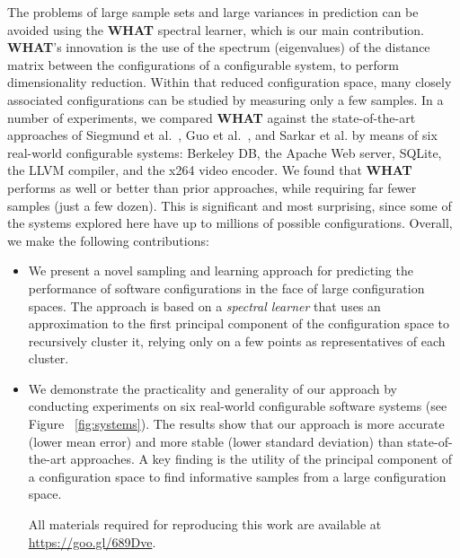 \documentclass[smallextended]{svjour3}       %
\newcommand{\what}{{\bf WHAT}\xspace}
\begin{document}
The problems of large sample sets and large variances in prediction can be avoided using the \what spectral learner, which is our main contribution.  
{\what}'s innovation is  the use of the spectrum (eigenvalues) of the distance matrix
between the configurations of a configurable system, to perform dimensionality reduction. Within that
reduced configuration space, many closely associated configurations can be studied
by measuring only a few samples.
In a number of experiments, we compared \what against the state-of-the-art approaches of Siegmund et al.~\cite{siegmund2012predicting}, Guo et al.~\cite{guo2013variability}, and Sarkar et al. \cite{sarkar2015cost} by means of six real-world configurable systems: Berkeley DB,  the Apache Web server, SQLite, the LLVM compiler, and the x264 video encoder.
We found that \what performs as well or better than prior approaches,
while  requiring far fewer samples (just a few dozen).
This is significant and most surprising, since some of the systems explored here have up to millions of possible configurations. 
\newpage
Overall, we make the following contributions:
\begin{itemize}
\item We present a novel sampling and learning approach for predicting the performance of software configurations in the face of large configuration spaces. The approach is based on a
{\em spectral
learner} that uses an approximation to the first principal component of the configuration space to recursively cluster it, relying only on a few points as representatives of each cluster.
\item We demonstrate the practicality and generality of our approach by conducting experiments on six real-world configurable software systems (see Figure ~\ref{fig:systems}). The results show that our approach is more accurate (lower mean error) and more stable (lower standard deviation) than state-of-the-art approaches. A key finding is the utility of the principal component of a configuration space to  find informative samples from a large configuration space.

All materials required for reproducing this work are available at \url{https://goo.gl/689Dve}.
\end{itemize}
\end{document}
